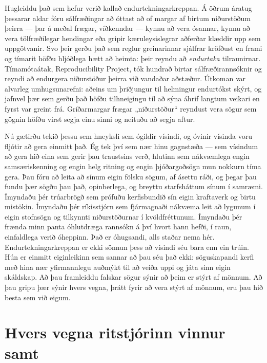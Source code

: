 Hugleiddu það sem hefur verið kallað endurtekningarkreppan. Á öðrum áratug þessarar aldar fóru sálfræðingar að óttast að of margar af birtum niðurstöðum þeirra — þar á meðal frægar, víðkenndar — kynnu að vera ósannar, kynnu að vera tölfræðilegar hendingar eða gripir kæruleysislegrar aðferðar klæddir upp sem uppgötvanir. Svo þeir gerðu það sem reglur greinarinnar sjálfrar kröfðust en frami og tímarit höfðu hljóðlega hætt að heimta: þeir reyndu að \emph{endurtaka} tilraunirnar. Tímamótaátak, Reproducibility Project, tók hundrað birtar sálfræðirannsóknir og reyndi að endurgera niðurstöður þeirra við vandaðar aðstæður. Útkoman var alvarleg umhugsunarefni: aðeins um þriðjungur til helmingur endurtókst skýrt, og jafnvel þær sem gerðu það höfðu tilhneigingu til að sýna áhrif langtum veikari en fyrst var greint frá. Gríðarmargar frægar „niðurstöður“ reyndust vera sögur sem gögnin höfðu virst segja einu sinni og neituðu að segja aftur.

Nú gætirðu tekið þessu sem hneyksli sem ógildir vísindi, og óvinir vísinda voru fljótir að gera einmitt það. Ég tek því sem nær hinu gagnstæða — sem vísindum að gera hið eina sem gerir þau traustsins verð, hlutinn sem nákvæmlega engin samsæriskenning og engin helg ritning og engin þjóðargoðsögn mun nokkurn tíma gera. Þau fóru að leita að sínum eigin fölsku sögum, af ásettu ráði, og þegar þau fundu þær sögðu þau það, opinberlega, og breyttu starfsháttum sínum í samræmi. Ímyndaðu þér trúarbrögð sem prófuðu kerfisbundið sín eigin kraftaverk og birtu mistökin. Ímyndaðu þér ríkisstjórn sem fjármagnaði nákvæma leit að lygunum í eigin stofnsögn og tilkynnti niðurstöðurnar í kvöldfréttunum. Ímyndaðu þér frænda minn panta óhlutdræga rannsókn á því hvort hann hefði, í raun, einfaldlega verið óheppinn. Það er óhugsandi, alls staðar nema hér. Endurtekningarkreppan er ekki sönnun þess að vísindi séu bara enn ein trúin. Hún er einmitt eiginleikinn sem sannar að þau séu það ekki: söguskapandi kerfi með hina nær yfirmannlegu auðmýkt til að veiða uppi og játa sinn eigin skáldskap. Að þau framleiddu falskar sögur sýnir að þeim er stýrt af mönnum. Að þau gripu þær sýnir hvers vegna, þrátt fyrir að vera stýrt af mönnum, eru þau hið besta sem við eigum.

\section*{Hvers vegna ritstjórinn vinnur samt}

